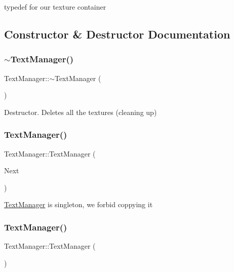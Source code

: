 typedef for our texture container 

\subsection{Constructor \& Destructor Documentation}
\mbox{\label{class_text_manager_a9176b8e0ebb67704649e5f7869b36317}} 
\subsubsection{\texorpdfstring{$\sim$TextManager()}{~TextManager()}}
{\footnotesize\ttfamily Text\+Manager\+::$\sim$\+Text\+Manager (\begin{DoxyParamCaption}{ }\end{DoxyParamCaption})}

Destructor. Deletes all the textures (cleaning up) \mbox{\label{class_text_manager_a399a24e6fd8323b89ef6f72e3402b122}} 
\subsubsection{\texorpdfstring{TextManager()}{TextManager()}\hspace{0.1cm}{\footnotesize\ttfamily [1/2]}}
{\footnotesize\ttfamily Text\+Manager\+::\+Text\+Manager (\begin{DoxyParamCaption}\item[{const \mbox{\hyperlink{class_text_manager}{Text\+Manager}} \&}]{Next }\end{DoxyParamCaption})\hspace{0.3cm}{\ttfamily [delete]}}

\mbox{\hyperlink{class_text_manager}{Text\+Manager}} is singleton, we forbid coppying it \mbox{\label{class_text_manager_a10708b85d4ba3241732df21961f1b4a4}} 
\subsubsection{\texorpdfstring{TextManager()}{TextManager()}\hspace{0.1cm}{\footnotesize\ttfamily [2/2]}}
{\footnotesize\ttfamily Text\+Manager\+::\+Text\+Manager (\begin{DoxyParamCaption}{ }\end{DoxyParamCaption})\hspace{0.3cm}{\ttfamily [private]}}

